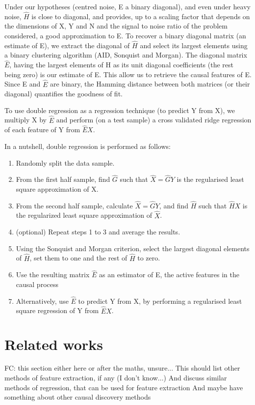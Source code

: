 \documentclass{article}
\begin{document}
Under our hypotheses (centred noise, E a binary diagonal), and even under heavy noise, $\hat H$ is close to diagonal, and provides, up to a scaling factor that depends on the dimensions of X, Y and N and the signal to noise ratio of the problem considered, a good approximation to E. To recover a binary diagonal matrix (an estimate of E), we extract the diagonal of $\hat H$ and select its largest elements using a binary clustering algorithm (AID, Sonquist and Morgan). The diagonal matrix $\hat E$, having the largest elements of H as its unit diagonal coefficients (the rest being zero) is our estimate of E. This allow us to retrieve the causal features of E. Since E and $\hat E$ are binary, the Hamming distance between both matrices (or their diagonal) quantifies the goodness of fit.

To use double regression as a regression technique (to predict Y from X), we multiply X by $\hat E$ and perform (on a test sample) a cross validated ridge regression of each feature of Y from $\hat E X$.

In a nutshell, double regression is performed as follows:
\begin{enumerate}
\item Randomly split the data sample.
\item From the first half sample, find $\hat G$ such that $\hat X = \hat G Y$ is the regularised least square approximation of X.
\item From the second half sample, calculate $\hat X = \hat G Y$, and find $\hat H$ such that $\hat H X$ is the regularized least square approximation of $\hat X$.
\item (optional) Repeat steps 1 to 3 and average the results.
\item Using the Sonquist and Morgan criterion, select the largest diagonal elements of $\hat H$, set them to one and the rest of $\hat  H$ to zero.
\item Use the resulting matrix $\hat E$ as an estimator of E, the active features in the causal process
\item Alternatively, use $\hat E$ to predict Y from X, by performing a regularised least square regression of Y from $\hat E X$. 
\end{enumerate}

\section{Related works}
FC: this section either here or after the maths, unsure... 
This should list other methods of feature extraction, if any (I don't know...)
And discuss similar methods of regression, that can be used for feature extraction
And maybe have something about other causal discovery methods
\end{document}
